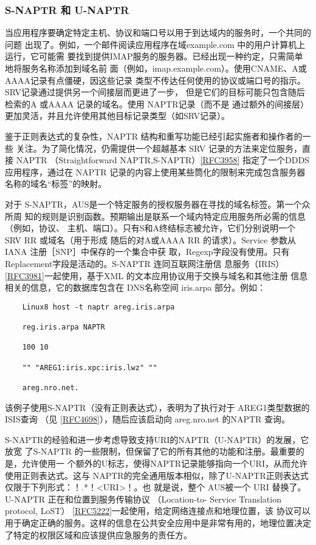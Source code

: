 \subsubsection{S-NAPTR 和 U-NAPTR}

当应用程序要确定特定主机、协议和端口号以用于到达域内的服务时，一个共同的问题
出现了。例如，一个邮件阅读应用程序在域example.com 中的用户计算机上运行，它可能需
要找到提供IMAP服务的服务器。已经出现一种约定，只需简单地将服务名称添加到域名前
面（例如，imap.example.com）。使用CNAME、A或AAAA记录有点僵硬，因这些记录
类型不传达任何使用的协议或端口号的指示。SRV记录通过提供另一个间接层而更进了一步，
但是它们的目标可能只包含随后检索的A 或AAAA 记录的域名。使用 NAPTR记录（而不是
通过额外的间接层）更加灵活，并且允许使用其他目标记录类型（如SRV记录）。

鉴于正则表达式的复杂性，NAPTR 结构和重写功能已经引起实施者和操作者的一些
关注。为了简化情况，仍需提供一个超越基本 SRV 记录的方法来定位服务，直接 NAPTR
（Straightforward NAPTR,S-NAPTR）\href{https://www.rfc-editor.org/rfc/rfc3958}{[RFC3958]} 指定了一个DDDS应用程序，通过在
NAPTR 记录的内容上使用某些筒化的限制来完成包含服务器名称的域名“标签”的映射。

对于 S-NAPTR，AUS是一个特定服务的授权服务器在寻找的域名标签。第一个众所周
知的规则是识别函数。预期输出是联系一个域内特定应用服务所必需的信息（例如，协议、
主机、端口）。只有S和A终结标志被允许，它们分别说明一个 SRV RR 或域名（用于形成
随后的对A或AAAA RR 的请求）。Service 参数从IANA 注册［SNP］中保存的一个集合中获
取，Regexp字段没有使用。只有 Replacement字段是活动的。S-NAPTR 连同互联网注册信
息服务（IRIS）\href{https://www.rfc-editor.org/rfc/rfc3981}{[RFC3981]}一起使用，基于XML 的文本应用协议用于交换与域名和其他注册
信息相关的信息，它的数据库包含在 DNS名称空间 iris.arpa 部分。例如：
\begin{verbatim}
    Linux8 host -t naptr areg.iris.arpa
    
    reg.iris.arpa NAPTR
    
    100 10
    
    "" "AREG1:iris.xpc:iris.lwz" ""
    
    areg.nro.net.
\end{verbatim}

该例子使用S-NAPTR（没有正则表达式），表明为了执行对于 AREG1类型数据的ISIS查询
（见 \href{https://www.rfc-editor.org/rfc/rfc4698}{[RFC4698]}），随后应该启动向 areg.nro.net 的NAPTR 查询。

S-NAPTR的经验和进一步考虑导致支持URI的NAPTR（U-NAPTR）的发展，它放宽
了S-NAPTR 的一些限制，但保留了它的所有其他的功能和注册。最重要的是，允许使用一
个额外的U标志，使得NAPTR记录能够指向一个URI，从而允许使用正则表达式。这与
NAPTR的完全通用版本相似，除了U-NAPTR正则表达式仅限于下列形式：！.*！<URI>！。也
就是说，整个 AUS被一个 URI 替换了。U-NAPTR 正在和位置到服务传输协议 （Location-to-
Service Translation protocol, LoST） \href{https://www.rfc-editor.org/rfc/rfc5222}{[RFC5222]}一起使用，给定网络连接点和地理位置，该
协议可以用于确定正确的服务。这样的信息在公共安全应用中是非常有用的，地理位置决定
了特定的权限区域和应该提供应急服务的责任方。


